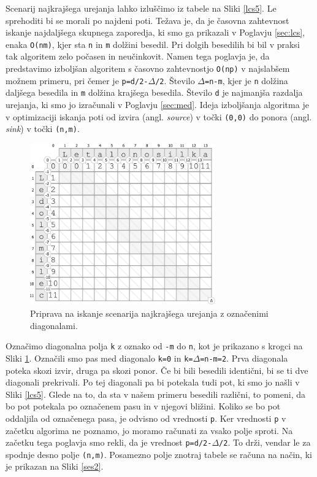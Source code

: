 \documentclass[a4paper, 12pt, twoside]{book}
\begin{document}
Scenarij najkrajšega urejanja lahko izluščimo iz tabele na Sliki \ref{lcs5}. Le sprehoditi bi se morali po najdeni poti. Težava je, da je časovna zahtevnost iskanje najdaljšega skupnega zaporedja, ki smo ga prikazali v Poglavju \ref{sec:lcs}, enaka {\tt O(nm)}, kjer sta {\tt n} in {\tt m} dolžini \linebreak besedil. Pri dolgih besedilih bi bil v praksi tak algoritem zelo počasen in neučinkovit. Namen tega poglavja je, da predstavimo izboljšan algoritem \cite{o-np} s časovno zahtevnostjo {\tt O(np)} v najslabšem možnem primeru, pri čemer je {\tt p=d/2-$\Delta$/2}. Število {\tt $\Delta$=n-m}, kjer je {\tt n} dolžina daljšega besedila in {\tt m} dolžina krajšega besedila. Število {\tt d} je najmanjša razdalja urejanja, ki smo jo izračunali v Poglavju \ref{sec:med}. Ideja izboljšanja algoritma je v optimizaciji iskanja poti od izvira (angl. \textit{source}) v točki {\tt (0,0)} do ponora (angl. \textit{sink}) v točki {\tt (n,m)}.

\begin{figure}[placement h]
\begin{center}
\includegraphics[width=8cm]{img/ses1.pdf}
\end{center}
\caption{Priprava na iskanje scenarija najkrajšega urejanja z označenimi diagonalami.}
\label{ses1}
\end{figure}

Označimo diagonalna polja {\tt k} z oznako od {\tt -m} do {\tt n}, kot je prikazano s krogci na Sliki \ref{ses1}. Označili smo pas med diagonalo {\tt k=0} in {\tt k=$\Delta$=n-m=2}. Prva diagonala poteka skozi izvir, druga pa skozi ponor. Če bi bili besedili identični, bi se ti dve diagonali prekrivali. Po tej diagonali pa bi potekala tudi pot, ki smo jo našli v Sliki \ref{lcs5}. Glede na to, da sta v našem primeru besedili različni, to pomeni, da bo pot potekala po označenem pasu in v njegovi bližini. Koliko se bo pot oddaljila od označenega pasa, je odvisno od vrednosti {\tt p}. Ker vrednosti {\tt p} v začetku algorima ne poznamo, jo moramo računati za vsako polje sproti. Na začetku tega poglavja smo rekli, da je vrednost {\tt p=d/2-$\Delta$/2}. To drži, vendar le za spodnje desno polje {\tt (n,m)}. Posamezno polje znotraj tabele se računa na način, ki je prikazan na Sliki \ref{ses2}.
\end{document}
